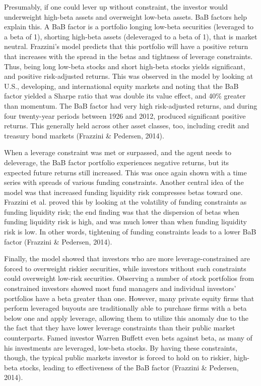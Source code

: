 \documentclass[12pt,twoside]{reedthesis}
\theoremstyle{definition}
\theoremstyle{definition}
\theoremstyle{definition}
\theoremstyle{remark}
\begin{document}
Presumably, if one could lever up without constraint, the investor would
underweight high-beta assets and overweight low-beta assets. BaB factors
help explain this. A BaB factor is a portfolio longing low-beta
securities (leveraged to a beta of 1), shorting high-beta assets
(deleveraged to a beta of 1), that is market neutral. Frazzini's model
predicts that this portfolio will have a positive return that increases
with the spread in the betas and tightness of leverage constraints.
Thus, being long low-beta stocks and short high-beta stocks yields
significant, and positive risk-adjusted returns. This was observed in
the model by looking at U.S., developing, and international equity
markets and noting that the BaB factor yielded a Sharpe ratio that was
double its value effect, and 40\% greater than momentum. The BaB factor
had very high risk-adjusted returns, and during four twenty-year periods
between 1926 and 2012, produced significant positive returns. This
generally held across other asset classes, too, including credit and
treasury bond markets (Frazzini \& Pedersen, 2014).

When a leverage constraint was met or surpassed, and the agent needs to
deleverage, the BaB factor portfolio experiences negative returns, but
its expected future returns still increased. This was once again shown
with a time series with spreads of various funding constraints. Another
central idea of the model was that increased funding liquidity risk
compresses betas toward one. Frazzini et al. proved this by looking at
the volatility of funding constraints as funding liquidity risk; the end
finding was that the dispersion of betas when funding liquidity risk is
high, and was much lower than when funding liquidity risk is low. In
other words, tightening of funding constraints leads to a lower BaB
factor (Frazzini \& Pedersen, 2014).

Finally, the model showed that investors who are more
leverage-constrained are forced to overweight riskier securities, while
investors without such constraints could overweight low-risk securities.
Observing a number of stock portfolios from constrained investors showed
most fund managers and individual investors' portfolios have a beta
greater than one. However, many private equity firms that perform
leveraged buyouts are traditionally able to purchase firms with a beta
below one and apply leverage, allowing them to utilize this anomaly due
to the the fact that they have lower leverage constraints than their
public market counterparts. Famed investor Warren Buffett even bets
against beta, as many of his investments are leveraged, low-beta stocks.
By having these constraints, though, the typical public markets investor
is forced to hold on to riskier, high-beta stocks, leading to
effectiveness of the BaB factor (Frazzini \& Pedersen, 2014).
\end{document}
